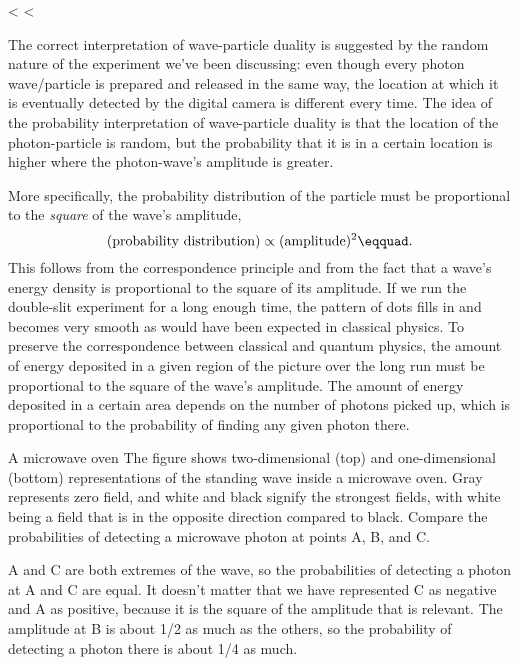 <%
<%

The correct interpretation of wave-particle duality is
suggested by the random nature of the experiment we've been
discussing: even though every photon wave/particle is
prepared and released in the same way, the location at which
it is eventually detected by the digital camera is different
every time. The idea of the probability interpretation of
wave-particle duality is that the location of the photon-particle
is random, but the probability that it is in a certain
location is higher where the photon-wave's amplitude is greater.

More specifically, the probability distribution of the
particle must be proportional to the \emph{square} of
the wave's amplitude,
\begin{equation*}
    (\text{probability distribution}) \propto (\text{amplitude})^2\eqquad.
\end{equation*}
This follows from the correspondence principle and from the
fact that a wave's energy density is proportional to the
square of its amplitude. If we run the double-slit
experiment for a long enough time, the pattern of dots fills
in and becomes very smooth as would have been expected in
classical physics. To preserve the correspondence between
classical and quantum physics, the amount of energy
deposited in a given region of the picture over the long run
must be proportional to the square of the wave's amplitude.
The amount of energy deposited in a certain area depends on
the number of photons picked up, which is proportional to
the probability of finding any given photon there.


\begin{eg}{A microwave oven}\label{eg:carrot}
\egquestion The figure shows two-dimensional (top) and
one-dimensional (bottom) representations of the standing
wave inside a microwave oven. Gray represents zero field,
and white and black signify the strongest fields, with white
being a field that is in the opposite direction compared to
black. Compare the probabilities of detecting a microwave
photon at points A, B, and C.

\eganswer A and C are both extremes of the wave, so the
probabilities of detecting a photon at A and C are equal.
It doesn't matter that we have represented C as negative
and A as positive, because it is the square of the amplitude
that is relevant. The amplitude at B is about 1/2 as much
as the others, so the probability of detecting a photon
there is about 1/4 as much.
\end{eg}

